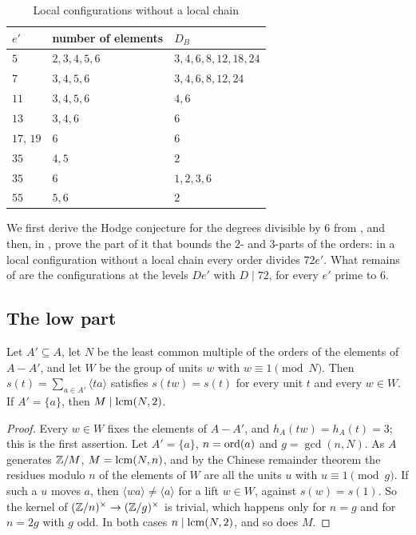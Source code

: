 \begin{table}[ht]
\centering
\caption{Local configurations without a local chain}\label{tab:residuals}
\begin{tabular}{@{}lll@{}}
\hline
$e'$ & number of elements & $D_{B}$\\
\hline
$5$ & $2,3,4,5,6$ & $3,4,6,8,12,18,24$\\
$7$ & $3,4,5,6$ & $3,4,6,8,12,24$\\
$11$ & $3,4,5,6$ & $4,6$\\
$13$ & $3,4,6$ & $6$\\
$17$, $19$ & $6$ & $6$\\
$35$ & $4,5$ & $2$\\
$35$ & $6$ & $1,2,3,6$\\
$55$ & $5,6$ & $2$\\
\hline
\end{tabular}
\end{table}

We first derive the Hodge conjecture for the degrees divisible by $6$ from
, and then, in , prove the part of it
that bounds the $2$- and $3$-parts of the orders: in a local configuration
without a local chain every order divides $72e'$. What remains of
 are the configurations at the levels $De'$ with $D\mid72$,
for every $e'$ prime to $6$.

\subsection{The low part}

\begin{lemma}\label{lem:lowinvariance}
Let $A'\subseteq A$, let $N$ be the least common multiple of the orders of
the elements of $A-A'$, and let $W$ be the group of units $w$ with $w\equiv1
\pmod N$. Then $s(t)=\sum_{a\in A'}\langle ta\rangle$ satisfies $s(tw)=s(t)$
for every unit $t$ and every $w\in W$. If $A'=\{a\}$, then $M\mid\operatorname{lcm}(N,2)$.
\end{lemma}

\begin{proof}
Every $w\in W$ fixes the elements of $A-A'$, and $h_{A}(tw)=h_{A}(t)=3$;
this is the first assertion. Let $A'=\{a\}$, $n=\operatorname{ord}(a)$ and
$g=\gcd(n,N)$. As $A$ generates $\mathbb{Z}/M$, $M=\operatorname{lcm}(N,n)$, and by the Chinese
remainder theorem the residues modulo $n$ of the elements of $W$ are all the
units $u$ with $u\equiv1\pmod g$. If such a $u$ moves $a$, then
$\langle wa\rangle\ne\langle a\rangle$ for a lift $w\in W$, against $s(w)=
s(1)$. So the kernel of $(\mathbb{Z}/n)^{\times}\to(\mathbb{Z}/g)^{\times}$ is trivial,
which happens only for $n=g$ and for $n=2g$ with $g$ odd. In both cases
$n\mid\operatorname{lcm}(N,2)$, and so does $M$.
\end{proof}

